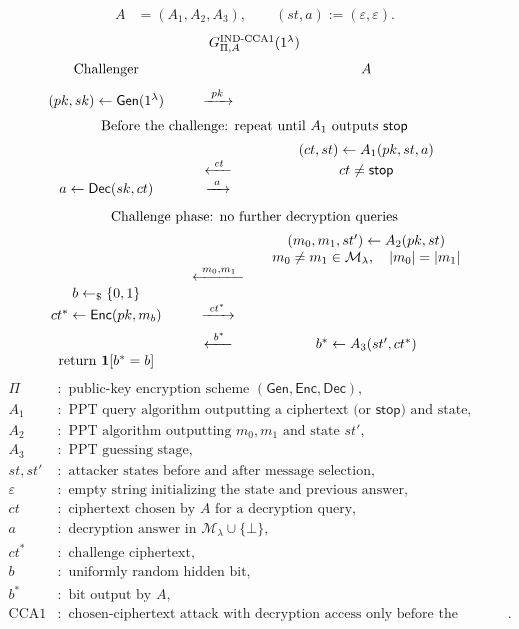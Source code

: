 \documentclass[12pt,a4paper]{article}
\begin{document}
\begin{definition}
\[
\begin{aligned}
A&=(A_1,A_2,A_3),\qquad (st,a):=(\varepsilon,\varepsilon).
\end{aligned}
\]
\begingroup\small
\[
\begin{array}{c@{\qquad}c@{\qquad}c}
\multicolumn{3}{c}{G_{\Pi,A}^{\mathrm{IND\text{-}CCA1}}(1^\lambda)}\\[7pt]
\text{Challenger}&&A\\[7pt]
(pk,sk)\leftarrow\mathsf{Gen}(1^\lambda)
&\xrightarrow{\ pk\ }&\\[6pt]
\multicolumn{3}{c}{\text{Before the challenge: repeat until }A_1\text{ outputs }\mathsf{stop}}\\[5pt]
&&(ct,st)\leftarrow A_1(pk,st,a)\\
&\xleftarrow{\ ct\ }&ct\ne\mathsf{stop}\\
a\leftarrow\mathsf{Dec}(sk,ct)
&\xrightarrow{\ a\ }&\\[8pt]
\multicolumn{3}{c}{\text{Challenge phase: no further decryption queries}}\\[5pt]
&&(m_0,m_1,st')\leftarrow A_2(pk,st)\\
&&m_0\ne m_1\in\mathcal M_\lambda,\quad |m_0|=|m_1|\\
&\xleftarrow{\ m_0,m_1\ }&\\
b\leftarrow_{\$}\{0,1\}&&\\
ct^*\leftarrow\mathsf{Enc}(pk,m_b)
&\xrightarrow{\ ct^*\ }&\\[5pt]
&\xleftarrow{\ b^*\ }&b^*\leftarrow A_3(st',ct^*)\\
\mathrm{return}\ \mathbf1[b^*=b]&&
\end{array}
\]
\endgroup
\[
\begin{aligned}
\Pi&:\text{ public-key encryption scheme }(\mathsf{Gen},\mathsf{Enc},\mathsf{Dec}),\\
A_1&:\text{ PPT query algorithm outputting a ciphertext (or }\mathsf{stop}\text{) and state},\\
A_2&:\text{ PPT algorithm outputting }m_0,m_1\text{ and state }st',\\
A_3&:\text{ PPT guessing stage},\\
st,st'&:\text{ attacker states before and after message selection},\\
\varepsilon&:\text{ empty string initializing the state and previous answer},\\
ct&:\text{ ciphertext chosen by }A\text{ for a decryption query},\\
a&:\text{ decryption answer in }\mathcal M_\lambda\cup\{\bot\},\\
ct^*&:\text{ challenge ciphertext},\\
b&:\text{ uniformly random hidden bit},\\
b^*&:\text{ bit output by }A,\\
\mathrm{CCA1}&:\text{ chosen-ciphertext attack with decryption access only before the challenge}.
\end{aligned}
\]
\end{definition}
\end{document}

